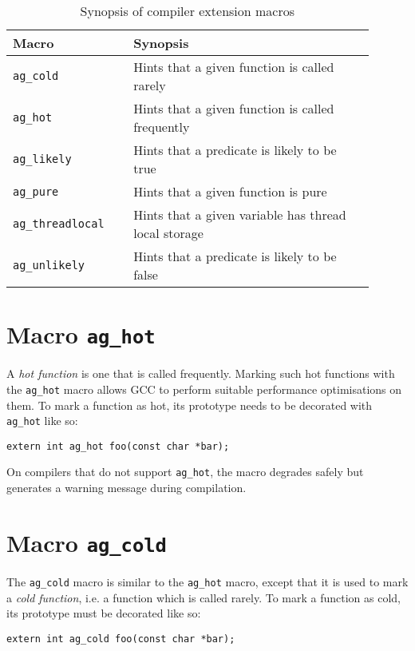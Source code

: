 \renewcommand\arraystretch{1.1}
\begin{table}[!htbp]
\centering
\small
\begin{tabular}[t]{>{\centering}m{0.3\linewidth}
    >{\raggedright\arraybackslash}m{0.6\linewidth}}
\toprule
\textbf{Macro} & \textbf{Synopsis} \\
\midrule
\texttt{ag\_cold} & Hints that a given function is called rarely \\
\texttt{ag\_hot} & Hints that a given function is called frequently \\
\texttt{ag\_likely} & Hints that a predicate is likely to be true \\
\texttt{ag\_pure} & Hints that a given function is pure \\
\texttt{ag\_threadlocal} & Hints that a given variable has thread local 
    storage \\
\texttt{ag\_unlikely} & Hints that a predicate is likely to be false \\
\bottomrule
\end{tabular}
\caption{Synopsis of compiler extension macros}
\label{tab:synopsis}
\end{table}


\section{Macro \texttt{ag\_hot}}
A \emph{hot function} is one that is called frequently. Marking such hot
functions with the \verb|ag_hot| macro allows GCC to perform suitable
performance optimisations on them. To mark a function as hot, its prototype
needs to be decorated with \verb|ag_hot| like so:
\begin{lstlisting}[linewidth=1.0\linewidth]
extern int ag_hot foo(const char *bar);
\end{lstlisting}

On compilers that do not support \verb|ag_hot|, the macro degrades safely
but generates a warning message during compilation.


\section{Macro \texttt{ag\_cold}}
The \verb|ag_cold| macro is similar to the \verb|ag_hot| macro, except
that it is used to mark a \emph{cold function}, i.e. a function which is called
rarely. To mark a function as cold, its prototype must be decorated like so:
\begin{lstlisting}[linewidth=1.0\linewidth]
extern int ag_cold foo(const char *bar);
\end{lstlisting}


